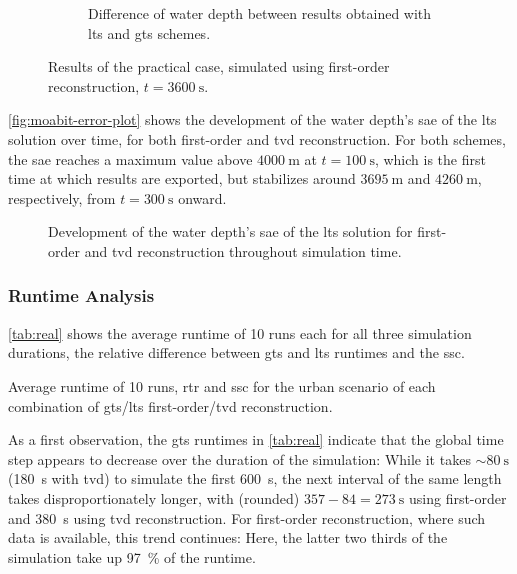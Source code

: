 \begin{figure} [p]
\begin{subfigure}[t]{0.45\textwidth}
    \caption{
      Difference of water depth between results obtained with \acrshort{lts} and \acrshort{gts} schemes.
    }
    \label{fig:moabit-3600s-lts-fo-diff}

  \end{subfigure}
  \caption{Results of the practical case, simulated using first-order reconstruction,  
  $t= \SI{3600}{\second}$.}
  \label{fig:moabit-3600s-lts-fo-paraview}
\end{figure}

\autoref{fig:moabit-error-plot} shows the development of the water depth's \gls{sae} of the \gls{lts} solution over time, for both first-order and \gls{tvd} reconstruction.
For both schemes, the \gls{sae} reaches a maximum value above $\SI{4000}{\meter}$ at $t=\SI{100}{\second}$, which is the first time at which results are exported, but stabilizes around $\SI{3695}{\meter}$ and $\SI{4260}{\meter}$, respectively, from $t=\SI{300}{\second}$ onward.

\begin{figure}[htbp]
  \centering
  
  \caption[
    Development of the water depth's \acrshort{sae} for first-order and \acrshort{tvd} reconstruction throughout simulation time.]{
    Development of the water depth's \acrshort{sae} of the \gls{lts} solution for first-order and \acrshort{tvd} reconstruction throughout simulation time.
  }
  \label{fig:moabit-error-plot}
\end{figure}

\subsubsection{Runtime Analysis}

\autoref{tab:real} shows the average runtime of 10 runs each for all three simulation durations, the relative difference between \gls{gts} and \gls{lts} runtimes and the \gls{ssc}.

\begin{table}[htb]
  \caption[Average runtime of 10 runs, \acrshort{rtr} and \acrshort{ssc} for the urban scenario.]
  {
    Average runtime of 10 runs, \acrfull{rtr} and \acrfull{ssc} for the urban scenario of each combination of \gls{gts}/\gls{lts} first-order/\gls{tvd} reconstruction.
  }
  \label{tab:real}
  \small
  \centering
  
\end{table}

As a first observation, the \gls{gts} runtimes in \autoref{tab:real} indicate that the global time step appears to decrease over the duration of the simulation: 
While it takes $\sim\!\SI{80}{\second}$ (\SI{180}{\second} with \gls{tvd}) to simulate the first \SI{600}{\second}, the next interval of the same length takes disproportionately longer, with (rounded) $\num{357} - \num{84} = \SI{273}{\second}$ using first-order and \SI{380}{\second} using \gls{tvd} reconstruction.
For first-order reconstruction, where such data is available, this trend continues: Here, the latter two thirds of the simulation take up \SI{97}{\percent} of the runtime.

